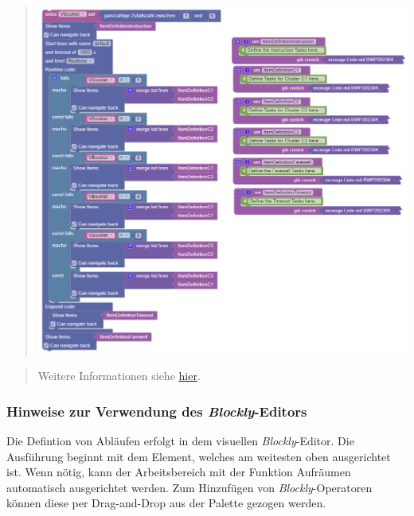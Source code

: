 \documentclass[
  letterpaper,
  DIV=11]{scrreprt}
\begin{document}
\begin{tcolorbox}
\begin{quote}
\includegraphics[width=5.20833in,height=\textheight]{img/screenshot-show-items-example-booklet-design-example-lists-01-DEU.png}
\end{quote}

\begin{quote}
Weitere Informationen siehe
\href{https://cba.itembuilder.de/chapter-cba-principles.html\#introduction-to-rotations}{hier}.
\end{quote}

\hypertarget{hinweise-zur-verwendung-des-blockly-editors-1}{%
\subsubsection{\texorpdfstring{Hinweise zur Verwendung des
\emph{Blockly}-Editors}{Hinweise zur Verwendung des Blockly-Editors}}\label{hinweise-zur-verwendung-des-blockly-editors-1}}

Die Defintion von Abläufen erfolgt in dem visuellen
\emph{Blockly}-Editor. Die Ausführung beginnt mit dem Element, welches
am weitesten oben ausgerichtet ist. Wenn nötig, kann der Arbeitsbereich
mit der Funktion Aufräumen automatisch ausgerichtet werden. Zum
Hinzufügen von \emph{Blockly}-Operatoren können diese per Drag-and-Drop
aus der Palette gezogen werden.


\end{tcolorbox}
\end{document}
